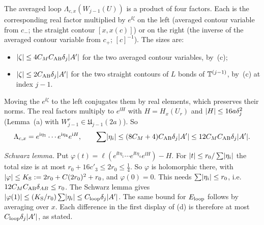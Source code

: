 \begin{detail}
\begin{step}
The averaged loop $\Lambda_{c,x}(W_{j-1}(U))$ is a product of four factors. Each is the corresponding real factor multiplied by $e^{\ii\zeta}$ on the left (averaged contour variable from $c_-$; the straight contour $[x,x(c)]$) or on the right (the inverse of the averaged contour variable from $c_+$; $[c]^{-1}$). The sizes are:
\begin{itemize}
\item $\lvert\zeta\rvert\le4C_MC_{\rm AB}\delta_j\lvert A'\rvert$ for the two averaged contour variables, by~(c);
\item $\lvert\zeta\rvert\le2C_{\rm AB}\delta_j\lvert A'\rvert$ for the two straight contours of $L$ bonds of $\mathbb T^{(j-1)}$, by~(c) at index $j-1$.
\end{itemize}
Moving the $e^{\ii\zeta}$ to the left conjugates them by real elements, which preserves their norms. The real factors multiply to $e^{\ii H}$ with $H=H_x(U_r)$ and $\lvert H\rvert\le16a\delta_j^2$ (Lemma~(a) with $W^r_{j-1}\in\mathfrak U_{j-1}(2a)$). So
\[
\Lambda_{c,x}=e^{\mathrm i\eta_1}\cdots e^{\mathrm i\eta_4}e^{\mathrm i H},\qquad\sum\lvert\eta_i\rvert\le(8C_M+4)C_{\rm AB}\delta_j\lvert A'\rvert\le12C_MC_{\rm AB}\delta_j\lvert A'\rvert .
\]

\emph{Schwarz lemma.} Put $\varphi(t)=\ell(e^{\ii t\eta_1}\cdots e^{\ii t\eta_4}e^{\ii H})-H$. For $\lvert t\rvert\le r_0/\sum\lvert\eta_i\rvert$ the total size is at most $r_0+16c'_3\le2r_0\le\frac14$. So $\varphi$ is holomorphic there, with $\lvert\varphi\rvert\le K_{\rm S}:=2r_0+C(2r_0)^2+r_0$, and $\varphi(0)=0$. This needs $\sum\lvert\eta_i\rvert\le r_0$, i.e.\ $12C_MC_{\rm AB}\delta_{AB}\le r_0$. The Schwarz lemma gives $\lvert\varphi(1)\rvert\le(K_{\rm S}/r_0)\sum\lvert\eta_i\rvert\le C_{\rm loop}\delta_j\lvert A'\rvert$. The same bound for $E_{\rm loop}$ follows by averaging over $x$. Each difference in the first display of (d) is therefore at most $C_{\rm loop}\delta_j\lvert A'\rvert$, as stated.
\end{step}
\end{detail}

